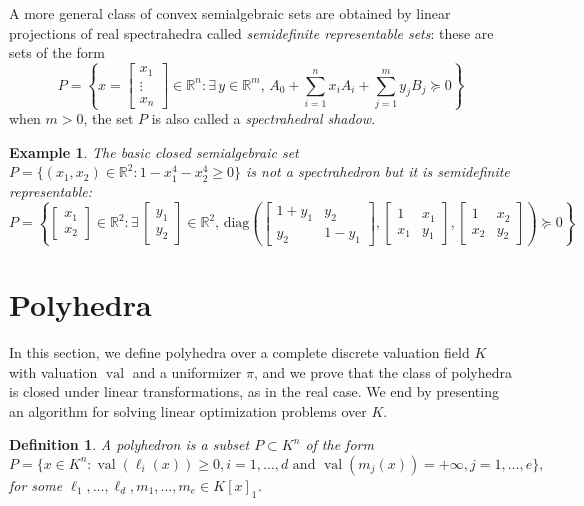 \documentclass[a4paper,12pt]{article}
\newtheorem{definition}[theorem]{Definition}
\newtheorem{example}[theorem]{Example}
\newcommand{\R}{\mathbb{R}} %
\DeclareMathOperator{\val}{val}
\def\diag{\mathrm{diag}}
\begin{document}
A more general class of convex semialgebraic sets are obtained by linear projections of real spectrahedra
called \emph{semidefinite representable sets}: these are sets of the form
$$
P = \left\{x = \left[\begin{smallmatrix} x_1 \\ \vdots \\ x_n \end{smallmatrix}\right] \in \R^n : \exists\,y\in\R^m, \, A_0 + \sum_{i=1}^n x_i A_i + \sum_{j=1}^m y_j B_j \succeq 0\right\}
$$
when $m>0$, the set $P$ is also called a \emph{spectrahedral shadow}.

\begin{example}
\label{fermat_quartic}
The basic closed semialgebraic set $P = \{(x_1,x_2) \in \R^2 : 1-x_1^4-x_2^4 \geq 0\}$ is not a spectrahedron
but it is semidefinite representable:
$$
P = \left\{\begin{bmatrix} x_1 \\ x_2 \end{bmatrix} \in \R^2 :
\exists\,
\begin{bmatrix} y_1 \\ y_2 \end{bmatrix} \in \R^2, \,
\diag\left(
\begin{bmatrix}
  1+y_1 & y_2 \\
  y_2 & 1-y_1
\end{bmatrix},
\begin{bmatrix}
  1 & x_1 \\
  x_1 & y_1
\end{bmatrix},
\begin{bmatrix}
  1 & x_2 \\
  x_2 & y_2
\end{bmatrix}
\right)
\succeq 0
\right\}
$$
\end{example}


\section{Polyhedra}

In this section, we define polyhedra over a complete discrete valuation field $K$ with valuation $\val$ and a uniformizer $\pi$, and we prove that the class of polyhedra is closed under linear transformations, as in the real case. We end by presenting an algorithm for solving linear optimization problems over $K$.

\begin{definition}
  \label{def_polyhedra}
  A \emph{polyhedron} is a subset $P \subset K^n$ of the form
  $$
  P = \{x \in K^n : \val(\ell_i(x)) \geq 0, i=1,\ldots,d \text{ and }
  \val(m_j(x)) = +\infty, j=1,\ldots,e\},
  $$
  for some $\ell_1,\ldots,\ell_d,m_1,\ldots,m_e \in K[x]_1$.
\end{definition}
\end{document}
